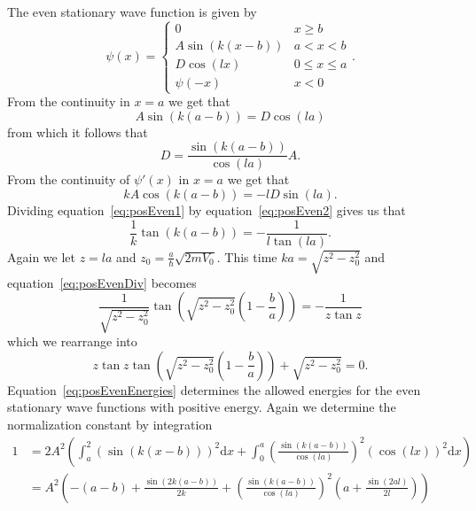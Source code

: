 \documentclass[12pt,a4paper]{article}
\begin{document}
The even stationary wave function is given by
\begin{equation}
\psi(x) = \begin{cases} 0 & x \geq b \\
                        A \sin \left(k (x - b) \right) & a < x < b \\
                        D \cos (l x) & 0 \leq x \leq a \\
                        \psi(-x) & x < 0
\end{cases}.
\end{equation}
From the continuity in $x = a$ we get that
\begin{equation}
A \sin \left(k (a - b) \right) = D \cos(l a) \label{eq:posEven1}
\end{equation}
from which it follows that
\begin{equation}
D = \frac{\sin \left(k (a - b) \right)}{\cos (l a)} A.
\end{equation}
From the continuity of $\psi'(x)$ in $x = a$ we get that
\begin{equation}
k A \cos \left(k (a - b) \right) = - l D \sin (la). \label{eq:posEven2}
\end{equation}
Dividing equation~\eqref{eq:posEven1} by equation~\eqref{eq:posEven2} gives us that
\begin{equation}
\frac{1}{k} \tan \left(k (a - b) \right) = - \frac{1}{l \tan (l a)}. \label{eq:posEvenDiv}
\end{equation}
Again we let $z = la$ and $z_0 = \frac{a}{\hbar} \sqrt{2 m V_0}$. This time $k a = \sqrt{z^2 - z_0^2}$ and equation~\eqref{eq:posEvenDiv} becomes
\begin{equation}
\frac{1}{\sqrt{z^2 - z_0^2}} \tan \left( \sqrt{z^2 - z_0^2} \left(1 - \frac{b}{a} \right) \right) = - \frac{1}{z \tan z}
\end{equation}
which we rearrange into
\begin{equation}
z \tan z \tan \left( \sqrt{z^2 - z_0^2} \left(1 - \frac{b}{a} \right) \right) + \sqrt{z^2 - z_0^2} = 0. \label{eq:posEvenEnergies}
\end{equation}
Equation~\eqref{eq:posEvenEnergies} determines the allowed energies for the even stationary wave functions with positive energy. Again we determine the normalization constant by integration
\begin{align}
1 &= 2 A^2 \left( \int_a^2 \left( \sin \left(k (x - b) \right) \right)^2 \mathrm{d} x + \int_0^a \left( \frac{\sin \left(k (a - b) \right)}{\cos (l a)} \right)^2 \left( \cos (lx) \right)^2 \mathrm{d} x \right) \\
  &= A^2 \left( -(a - b) + \frac{\sin \left( 2 k (a - b) \right)}{2 k}  + \left( \frac{\sin \left(k (a - b) \right)}{\cos (la)} \right)^2 \left(a + \frac{\sin(2 a l)}{2 l} \right) \right)
\end{align}
\end{document}

